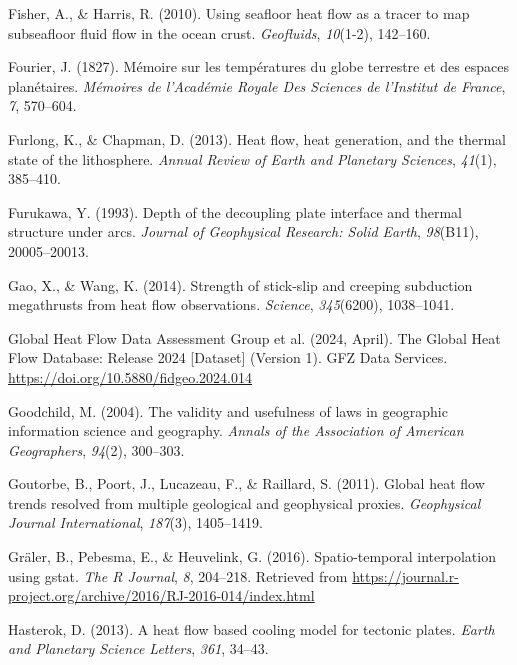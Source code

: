 \documentclass[draft,linenumbers]{agujournal2019}
\newlength{\cslhangindent}
\newenvironment{CSLReferences}[2]
 {\begin{list}{}{
  \setlength{\itemindent}{0pt}
  \setlength{\leftmargin}{0pt}
  \setlength{\parsep}{0pt}
  \ifodd #1
   \setlength{\leftmargin}{\cslhangindent}
   \setlength{\itemindent}{-\cslhangindent}
  \fi
  \setlength{\itemsep}{#2\baselineskip}
  }
  \item\relax}
 {\end{list}}
\begin{document}
\begin{CSLReferences}{1}{0}
Fisher, A., \& Harris, R. (2010). Using seafloor heat flow as a tracer
to map subseafloor fluid flow in the ocean crust. \emph{Geofluids},
\emph{10}(1-2), 142--160.

Fourier, J. (1827). Mémoire sur les températures du globe terrestre et
des espaces planétaires. \emph{Mémoires de l'Académie Royale Des
Sciences de l'Institut de France}, \emph{7}, 570--604.

Furlong, K., \& Chapman, D. (2013). Heat flow, heat generation, and the
thermal state of the lithosphere. \emph{Annual Review of Earth and
Planetary Sciences}, \emph{41}(1), 385--410.

Furukawa, Y. (1993). Depth of the decoupling plate interface and thermal
structure under arcs. \emph{Journal of Geophysical Research: Solid
Earth}, \emph{98}(B11), 20005--20013.

Gao, X., \& Wang, K. (2014). Strength of stick-slip and creeping
subduction megathrusts from heat flow observations. \emph{Science},
\emph{345}(6200), 1038--1041.

Global Heat Flow Data Assessment Group et al. (2024, April). {The Global
Heat Flow Database: Release 2024 {[}Dataset{]}} (Version 1). {GFZ Data
Services}. \url{https://doi.org/10.5880/fidgeo.2024.014}

Goodchild, M. (2004). The validity and usefulness of laws in geographic
information science and geography. \emph{Annals of the Association of
American Geographers}, \emph{94}(2), 300--303.

Goutorbe, B., Poort, J., Lucazeau, F., \& Raillard, S. (2011). Global
heat flow trends resolved from multiple geological and geophysical
proxies. \emph{Geophysical Journal International}, \emph{187}(3),
1405--1419.

Gräler, B., Pebesma, E., \& Heuvelink, G. (2016). Spatio-temporal
interpolation using gstat. \emph{The R Journal}, \emph{8}, 204--218.
Retrieved from
\url{https://journal.r-project.org/archive/2016/RJ-2016-014/index.html}

Hasterok, D. (2013). A heat flow based cooling model for tectonic
plates. \emph{Earth and Planetary Science Letters}, \emph{361}, 34--43.


\end{CSLReferences}
\end{document}
